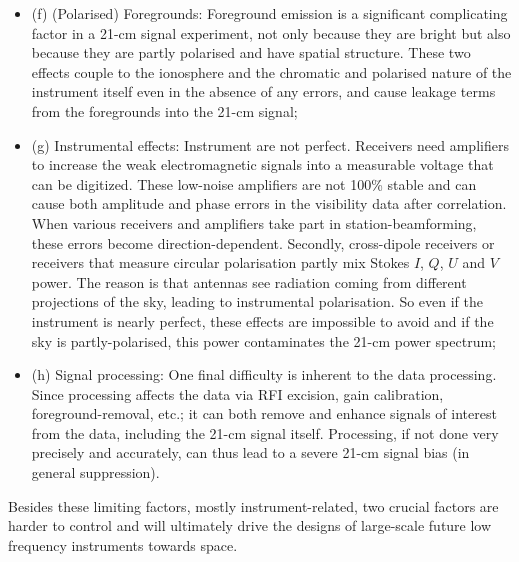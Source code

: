 \begin{itemize}
\item (f) (Polarised) Foregrounds: Foreground emission is a significant complicating factor in a 21-cm signal experiment, not only because they are bright but also because they are partly polarised and have spatial structure. These two effects couple to the ionosphere and the chromatic and polarised nature of the instrument itself even in the absence of any errors, and cause leakage terms from the foregrounds into the 21-cm signal; 
%
\item (g) Instrumental effects: Instrument are not perfect. Receivers need amplifiers to increase the weak electromagnetic signals into a measurable voltage that can be digitized. These low-noise amplifiers are not 100\% stable and can cause both amplitude and phase errors in the visibility data after correlation. When various receivers and amplifiers take part in station-beamforming, these errors become direction-dependent. Secondly, cross-dipole receivers or receivers that measure circular polarisation partly mix Stokes $I$, $Q$, $U$ and $V$ power. The reason is that antennas see radiation coming from different projections of the sky, leading to instrumental polarisation. So even if the instrument is nearly perfect, these effects are impossible to avoid and if the sky is partly-polarised, this power contaminates the 21-cm power spectrum; 
%
\item (h) Signal processing: One final difficulty is inherent to the data processing. Since processing affects the data via RFI excision, gain calibration, foreground-removal, etc.; it can both remove and enhance signals of interest from the data, including the 21-cm signal itself. Processing, if not done very precisely and accurately, can thus lead to a severe 21-cm signal bias (in general suppression).  
\end{itemize} 

\noindent Besides these limiting factors, mostly instrument-related, two crucial factors are harder to control and will ultimately drive the designs of large-scale future low frequency instruments towards space.\\

